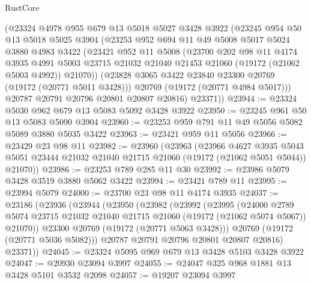 \begin{lexlean}{RustCore}
\begin{coremodule}
      (@23324
        @4978
        @955
        @679
        @13
        @5018
        @5027
        @3428
        @3922
        (@23245
          @954
          @50
          @13
          @5018
          @5025
          @3904
          (@23253
            @952
            @694
            @11
            @49
            @5008
            @5017
            @5024
            @3880
            @4983
            @3422
            (@23421
              @952
              @11
              @5008
              (@23700
                @202
                @98
                @11
                @4174
                @3935
                @4991
                @5003
                @23715
                @21032
                @21040
                @21453
                @21060
                (@19172 (@21062 @5003 @4992))
                @21070))
            (@23828 @3065 @3422 @23840 @23300 @20769 (@19172 (@20771 @5011 @3428)))
            @20769
            (@19172 (@20771 @4984 @5017)))
          @20787
          @20791
          @20796
          @20801
          @20807
          @20816)
        @23371))
@23944 := @23324 @5030 @962 @679 @13 @5083 @5092 @3428 @3922
@23950 := @23245 @961 @50 @13 @5083 @5090 @3904
@23960 := @23253 @959 @791 @11 @49 @5056 @5082 @5089 @3880 @5035 @3422
@23963 := @23421 @959 @11 @5056
@23966 := @23429 @23 @98 @11
@23982 := @23960
    (@23963
      (@23966
        @4627
        @3935
        @5043
        @5051
        @23444
        @21032
        @21040
        @21715
        @21060
        (@19172 (@21062 @5051 @5044))
        @21070))
@23986 := @23253 @789 @285 @11 @30
@23992 := @23986 @5079 @3428 @3519 @3880 @5062 @3422
@23994 := @23421 @789 @11
@23995 := @23994 @5079
@24000 := @23700 @23 @98 @11 @4174 @3935
@24037 := @23186
    (@23936
      (@23944
        (@23950
          (@23982
            (@23992
              (@23995
                (@24000
                  @2789
                  @5074
                  @23715
                  @21032
                  @21040
                  @21715
                  @21060
                  (@19172 (@21062 @5074 @5067))
                  @21070))
              @23300
              @20769
              (@19172 (@20771 @5063 @3428)))
            @20769
            (@19172 (@20771 @5036 @5082)))
          @20787
          @20791
          @20796
          @20801
          @20807
          @20816)
        @23371))
@24045 := @23324 @5095 @969 @679 @13 @3428 @5103 @3428 @3922
@24047 := @20930 @23094 @3997
@24055 := @24047 @325 @968 @1881 @13 @3428 @5101 @3532 @2098
@24057 := @19207 @23094 @3997

\end{coremodule}
\end{lexlean}
